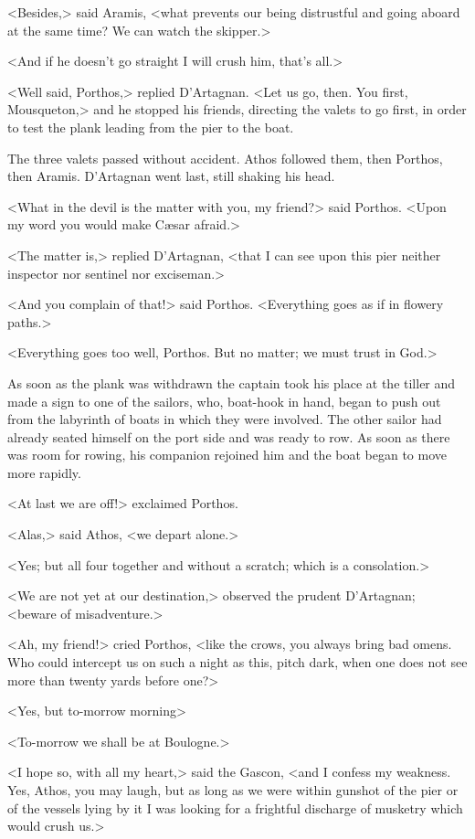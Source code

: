<Besides,> said Aramis, <what prevents our being distrustful and going aboard at the same time? We can watch the skipper.>

<And if he doesn't go straight I will crush him, that's all.>

<Well said, Porthos,> replied D'Artagnan. <Let us go, then. You first, Mousqueton,> and he stopped his friends, directing the valets to go first, in order to test the plank leading from the pier to the boat.

The three valets passed without accident. Athos followed them, then Porthos, then Aramis. D'Artagnan went last, still shaking his head.

<What in the devil is the matter with you, my friend?> said Porthos. <Upon my word you would make Cæsar afraid.>

<The matter is,> replied D'Artagnan, <that I can see upon this pier neither inspector nor sentinel nor exciseman.>

<And you complain of that!> said Porthos. <Everything goes as if in flowery paths.>

<Everything goes too well, Porthos. But no matter; we must trust in God.>

As soon as the plank was withdrawn the captain took his place at the tiller and made a sign to one of the sailors, who, boat-hook in hand, began to push out from the labyrinth of boats in which they were involved. The other sailor had already seated himself on the port side and was ready to row. As soon as there was room for rowing, his companion rejoined him and the boat began to move more rapidly.

<At last we are off!> exclaimed Porthos.

<Alas,> said Athos, <we depart alone.>

<Yes; but all four together and without a scratch; which is a consolation.>

<We are not yet at our destination,> observed the prudent D'Artagnan; <beware of misadventure.>

<Ah, my friend!> cried Porthos, <like the crows, you always bring bad omens. Who could intercept us on such a night as this, pitch dark, when one does not see more than twenty yards before one?>

<Yes, but to-morrow morning\longdash>

<To-morrow we shall be at Boulogne.>

<I hope so, with all my heart,> said the Gascon, <and I confess my weakness. Yes, Athos, you may laugh, but as long as we were within gunshot of the pier or of the vessels lying by it I was looking for a frightful discharge of musketry which would crush us.>

